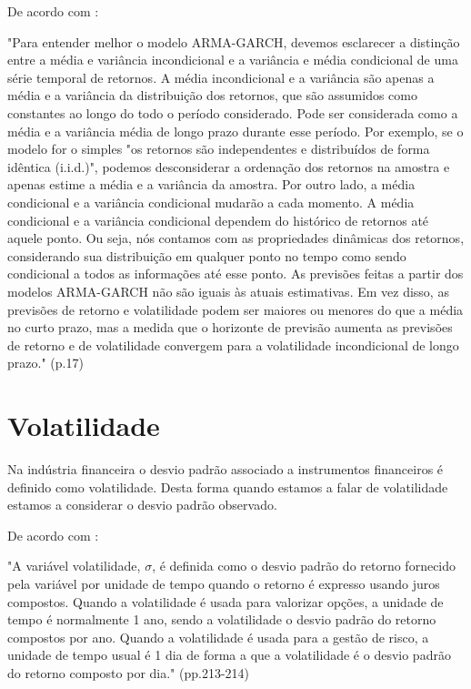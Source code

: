 \documentclass[
  12pt,
  a4paper,
  openany]{book}
\begin{document}
De acordo com \citet{oscar}:

\begin{spacing}{1}
\begin{adjustwidth}{28.3464pt}{28.3464pt}\footnotesize
"Para entender melhor o modelo ARMA-GARCH, devemos esclarecer a distinção entre a média e variância incondicional e a variância e média  condicional de uma série temporal de retornos. A média incondicional e a variância são apenas a média e a variância da distribuição dos retornos, que são assumidos como constantes ao longo do todo o período considerado. Pode ser considerada como a média e a variância média de longo prazo durante esse período. Por exemplo, se o modelo for o simples "os retornos são independentes e distribuídos de forma idêntica (i.i.d.)", podemos desconsiderar a ordenação dos retornos na amostra e apenas estime a média e a variância da amostra.
Por outro lado, a média condicional e a variância condicional mudarão a cada momento. A média condicional e a variância condicional dependem do histórico de retornos até aquele ponto. Ou seja, nós contamos com as propriedades dinâmicas dos retornos, considerando sua distribuição em qualquer ponto no tempo como sendo condicional a todos as informações até esse ponto. As previsões feitas a partir dos modelos ARMA-GARCH não são iguais às atuais estimativas. Em vez disso, as previsões de retorno e volatilidade podem ser maiores ou menores do que a média no curto prazo, mas a medida que o horizonte de previsão aumenta as previsões de retorno e de volatilidade convergem para a volatilidade incondicional de longo prazo." (p.17)
\normalsize\end{adjustwidth}
\end{spacing}
\medskip

\hypertarget{volatilidade}{%
\section{Volatilidade}\label{volatilidade}}

Na indústria financeira o desvio padrão associado a instrumentos financeiros é definido como volatilidade. Desta forma quando estamos a falar de volatilidade estamos a considerar o desvio padrão observado.

De acordo com \citet{HullRisk2018}:

\begin{spacing}{1}
\begin{adjustwidth}{28.3464pt}{28.3464pt}\footnotesize
"A variável volatilidade, $\sigma$, é definida como o desvio padrão do retorno fornecido pela variável por unidade de tempo quando o retorno é expresso usando juros compostos. Quando a volatilidade é usada para valorizar opções, a unidade de tempo é normalmente 1 ano, sendo a volatilidade o desvio padrão do retorno compostos por ano. Quando a volatilidade é usada para a gestão de risco, a unidade de tempo usual é 1 dia de forma a que a volatilidade é o desvio padrão do retorno composto por dia." (pp.213-214)
\normalsize\end{adjustwidth}
\end{spacing}
\medskip
\end{document}
